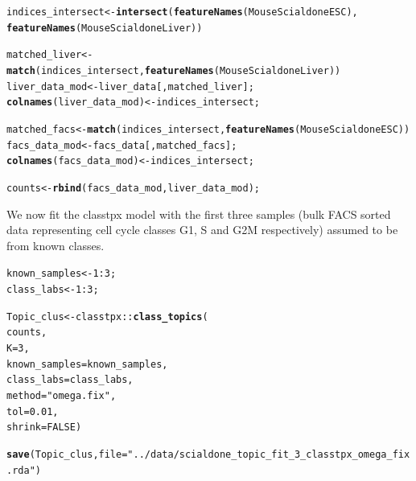 \documentclass[12pt]{article}\usepackage[]{graphicx}\usepackage[usenames,dvipsnames]{color}
\makeatletter
\newcommand{\hlnum}[1]{\textcolor[rgb]{0.686,0.059,0.569}{#1}}%
\newcommand{\hlstr}[1]{\textcolor[rgb]{0.192,0.494,0.8}{#1}}%
\newcommand{\hlopt}[1]{\textcolor[rgb]{0,0,0}{#1}}%
\newcommand{\hlstd}[1]{\textcolor[rgb]{0.345,0.345,0.345}{#1}}%
\newcommand{\hlkwb}[1]{\textcolor[rgb]{0.69,0.353,0.396}{#1}}%
\newcommand{\hlkwc}[1]{\textcolor[rgb]{0.333,0.667,0.333}{#1}}%
\newcommand{\hlkwd}[1]{\textcolor[rgb]{0.737,0.353,0.396}{\textbf{#1}}}%
\newenvironment{kframe}{%
 \def\at@end@of@kframe{}%
 \ifinner\ifhmode%
  \def\at@end@of@kframe{\end{minipage}}%
  \begin{minipage}{\columnwidth}%
 \fi\fi%
 \def\FrameCommand##1{\hskip\@totalleftmargin \hskip-\fboxsep
 \colorbox{shadecolor}{##1}\hskip-\fboxsep
     \hskip-\linewidth \hskip-\@totalleftmargin \hskip\columnwidth}%
 \MakeFramed {\advance\hsize-\width
   \@totalleftmargin\z@ \linewidth\hsize
   \@setminipage}}%
 {\par\unskip\endMakeFramed%
 \at@end@of@kframe}
\newenvironment{knitrout}{}{} %
\makeatother
\begin{document}
\begin{knitrout}
\color{fgcolor}\begin{kframe}
\begin{alltt}
\hlstd{indices_intersect} \hlkwb{<-} \hlkwd{intersect}\hlstd{(}\hlkwd{featureNames}\hlstd{(MouseScialdoneESC),}
                               \hlkwd{featureNames}\hlstd{(MouseScialdoneLiver))}

\hlstd{matched_liver} \hlkwb{<-}  \hlkwd{match}\hlstd{(indices_intersect,} \hlkwd{featureNames}\hlstd{(MouseScialdoneLiver))}
\hlstd{liver_data_mod} \hlkwb{<-} \hlstd{liver_data[,matched_liver];}
\hlkwd{colnames}\hlstd{(liver_data_mod)} \hlkwb{<-} \hlstd{indices_intersect;}

\hlstd{matched_facs} \hlkwb{<-} \hlkwd{match}\hlstd{(indices_intersect,} \hlkwd{featureNames}\hlstd{(MouseScialdoneESC))}
\hlstd{facs_data_mod} \hlkwb{<-} \hlstd{facs_data[,matched_facs];}
\hlkwd{colnames}\hlstd{(facs_data_mod)} \hlkwb{<-}  \hlstd{indices_intersect;}

\hlstd{counts} \hlkwb{<-} \hlkwd{rbind}\hlstd{(facs_data_mod, liver_data_mod);}
\end{alltt}
\end{kframe}
\end{knitrout}

We now fit the classtpx model with the first three samples (bulk FACS sorted data representing
cell cycle classes G1, S and G2M respectively) assumed to be from known classes.

\begin{knitrout}
\color{fgcolor}\begin{kframe}
\begin{alltt}
\hlstd{known_samples} \hlkwb{<-} \hlnum{1}\hlopt{:}\hlnum{3}\hlstd{;}
\hlstd{class_labs} \hlkwb{<-}  \hlnum{1}\hlopt{:}\hlnum{3}\hlstd{;}
\end{alltt}
\end{kframe}
\end{knitrout}

\begin{knitrout}
\color{fgcolor}\begin{kframe}
\begin{alltt}
\hlstd{Topic_clus} \hlkwb{<-} \hlstd{classtpx}\hlopt{::}\hlkwd{class_topics}\hlstd{(}
    \hlstd{counts,}
    \hlkwc{K}\hlstd{=}\hlnum{3}\hlstd{,}
    \hlkwc{known_samples} \hlstd{= known_samples,}
    \hlkwc{class_labs} \hlstd{= class_labs,}
    \hlkwc{method}\hlstd{=}\hlstr{"omega.fix"}\hlstd{,}
    \hlkwc{tol}\hlstd{=}\hlnum{0.01}\hlstd{,}
    \hlkwc{shrink}\hlstd{=}\hlnum{FALSE}\hlstd{)}

\hlkwd{save}\hlstd{(Topic_clus,} \hlkwc{file}\hlstd{=}\hlstr{"../data/scialdone_topic_fit_3_classtpx_omega_fix.rda"}\hlstd{)}
\end{alltt}
\end{kframe}
\end{knitrout}
\end{document}
